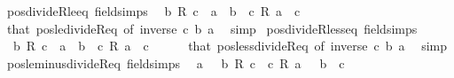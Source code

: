 \begin{isabellebody}
%
\isadelimproof
\isanewline
%
\endisadelimproof
\isanewline
{}\isamarkupfalse%
\ pos{\isacharunderscore}{\kern0pt}divideR{\isacharunderscore}{\kern0pt}le{\isacharunderscore}{\kern0pt}eq\ {\isacharbrackleft}{\kern0pt}field{\isacharunderscore}{\kern0pt}simps{\isacharbrackright}{\kern0pt}{\isacharcolon}{\kern0pt}\isanewline
\ \ {\isachardoublequoteopen}b\ {\isacharslash}{\kern0pt}\isactrlsub R\ c\ {\isasymle}\ a\ {\isasymlongleftrightarrow}\ b\ {\isasymle}\ c\ {\isacharasterisk}{\kern0pt}\isactrlsub R\ a{\isachardoublequoteclose}\ \ {\isachardoublequoteopen}c\ {\isachargreater}{\kern0pt}\ {}{\isachardoublequoteclose}\isanewline
%
\isadelimproof
\ \ %
\endisadelimproof
%
\isatagproof
{}\isamarkupfalse%
\ that\ pos{\isacharunderscore}{\kern0pt}le{\isacharunderscore}{\kern0pt}divideR{\isacharunderscore}{\kern0pt}eq\ {\isacharbrackleft}{\kern0pt}of\ {\isachardoublequoteopen}inverse\ c{\isachardoublequoteclose}\ b\ a{\isacharbrackright}{\kern0pt}\ \isamarkupfalse%
\ simp%
\endisatagproof
{\isafoldproof}%
%
\isadelimproof
\isanewline
%
\endisadelimproof
\isanewline
{}\isamarkupfalse%
\ pos{\isacharunderscore}{\kern0pt}divideR{\isacharunderscore}{\kern0pt}less{\isacharunderscore}{\kern0pt}eq\ {\isacharbrackleft}{\kern0pt}field{\isacharunderscore}{\kern0pt}simps{\isacharbrackright}{\kern0pt}{\isacharcolon}{\kern0pt}\isanewline
\ \ {\isachardoublequoteopen}b\ {\isacharslash}{\kern0pt}\isactrlsub R\ c\ {\isacharless}{\kern0pt}\ a\ {\isasymlongleftrightarrow}\ b\ {\isacharless}{\kern0pt}\ c\ {\isacharasterisk}{\kern0pt}\isactrlsub R\ a{\isachardoublequoteclose}\ \ {\isachardoublequoteopen}c\ {\isachargreater}{\kern0pt}\ {}{\isachardoublequoteclose}\isanewline
%
\isadelimproof
\ \ %
\endisadelimproof
%
\isatagproof
{}\isamarkupfalse%
\ that\ pos{\isacharunderscore}{\kern0pt}less{\isacharunderscore}{\kern0pt}divideR{\isacharunderscore}{\kern0pt}eq\ {\isacharbrackleft}{\kern0pt}of\ {\isachardoublequoteopen}inverse\ c{\isachardoublequoteclose}\ b\ a{\isacharbrackright}{\kern0pt}\ \isamarkupfalse%
\ simp%
\endisatagproof
{\isafoldproof}%
%
\isadelimproof
\isanewline
%
\endisadelimproof
\isanewline
{}\isamarkupfalse%
\ pos{\isacharunderscore}{\kern0pt}le{\isacharunderscore}{\kern0pt}minus{\isacharunderscore}{\kern0pt}divideR{\isacharunderscore}{\kern0pt}eq\ {\isacharbrackleft}{\kern0pt}field{\isacharunderscore}{\kern0pt}simps{\isacharbrackright}{\kern0pt}{\isacharcolon}{\kern0pt}\isanewline
\ \ {\isachardoublequoteopen}a\ {\isasymle}\ {\isacharminus}{\kern0pt}\ {\isacharparenleft}{\kern0pt}b\ {\isacharslash}{\kern0pt}\isactrlsub R\ c{\isacharparenright}{\kern0pt}\ {\isasymlongleftrightarrow}\ c\ {\isacharasterisk}{\kern0pt}\isactrlsub R\ a\ {\isasymle}\ {\isacharminus}{\kern0pt}\ b{\isachardoublequoteclose}\ \ {\isachardoublequoteopen}c\ {\isachargreater}{\kern0pt}\ {}{\isachardoublequoteclose}\isanewline

\end{isabellebody}
